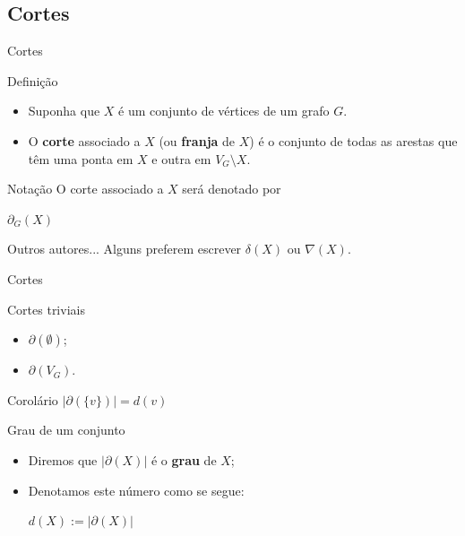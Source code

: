 \documentclass[xcolor=dvipsnames,table]{beamer}
\begin{document}
	\subsection{Cortes}
	\begin{frame}{Cortes}
		\begin{block}{Definição}
			\begin{itemize}
				\item Suponha que $X$ é um conjunto de vértices de um grafo $G$.   
				\item O {\bf corte} associado a $X$ (ou {\bf franja} de $X$) é o conjunto de todas as arestas que têm uma ponta em $X$ e outra em $V_G \setminus X$.
			\end{itemize}
		\end{block}   
		\begin{block}{Notação}
			O corte associado a $X$ será denotado por
			\begin{center}
				$\partial_G (X)$
			\end{center}
		\end{block}   
		\begin{alertblock}{Outros autores...}
			Alguns preferem escrever $\delta(X)$ ou $\nabla(X)$.
		\end{alertblock}
	\end{frame}
	
	\begin{frame}{Cortes}
		\begin{block}{Cortes triviais}
			\begin{itemize}
				\item $\partial( \emptyset )$;   
				\item $\partial( V_G )$.
			\end{itemize}
		\end{block}   
		\begin{block}{Corolário}
			$|\partial(\{v\})| = d(v)$
		\end{block}   
		\begin{block}{Grau de um conjunto}
			\begin{itemize}
				\item Diremos que $|\partial(X)|$ é o {\bf grau} de $X$;   
				\item Denotamos este número como se segue:
				\begin{center}
					$d(X) := |\partial(X)|$
				\end{center}
			\end{itemize}
		\end{block}
	\end{frame}
	
\end{document}
